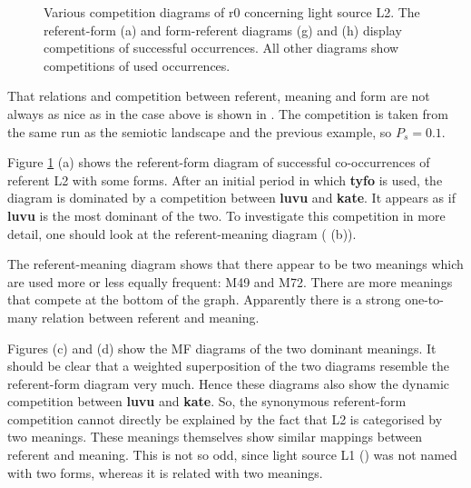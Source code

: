 \begin{figure}
\centering
{}
\caption{Various competition diagrams of r0 concerning light source L2. The referent-form (a) and form-referent diagrams (g) and (h) display competitions of successful occurrences. All other diagrams show competitions of used occurrences.}
\label{f:opt:ggcomp2}
\end{figure}

That relations and competition between referent, meaning and form are not always as nice as in the case above is shown in . The competition is taken from the same run as the semiotic landscape and the previous example, so $P_s=0.1$.

Figure \ref{f:opt:ggcomp2} (a) shows the referent-form diagram of successful co-occurrences of referent L2 with some forms. After an initial period in which {\bf tyfo} is used, the diagram is dominated by a competition between {\bf luvu} and {\bf kate}. It appears as if {\bf luvu} is the most dominant of the two. To investigate this competition in more detail, one should look at the referent-meaning diagram ( (b)).

The referent-meaning diagram shows that there appear to be two meanings which are used more or less equally frequent: M49 and M72. There are more meanings that compete at the bottom of the graph. Apparently there is a strong one-to-many relation between referent and meaning. 

Figures (c) and (d) show the MF diagrams of the two dominant meanings. It should be clear that a weighted superposition of the two diagrams resemble the referent-form diagram very much. Hence these diagrams also show the dynamic competition between {\bf luvu} and {\bf kate}. So, the synonymous referent-form competition cannot directly be explained by the fact that L2 is categorised by two meanings. These meanings themselves show similar mappings between referent and meaning. This is not so odd, since light source L1 () was not named with two forms, whereas it is related with two meanings.

